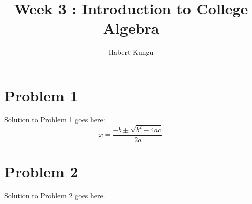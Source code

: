 \documentclass{article}
\begin{document}
\title{Week 3 : Introduction to College Algebra}
\author{Habert Kungu }
\maketitle

\section*{Problem 1}
Solution to Problem 1 goes here:
\[
x = \frac{-b \pm \sqrt{b^2 - 4ac}}{2a}
\]

\section*{Problem 2}
Solution to Problem 2 goes here.
\end{document}
